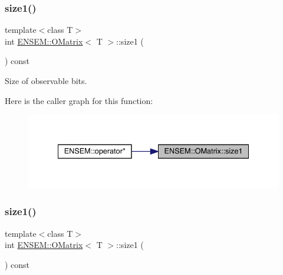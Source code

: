 \subsubsection{\texorpdfstring{size1()}{size1()}\hspace{0.1cm}{\footnotesize\ttfamily [1/3]}}
{\footnotesize\ttfamily template$<$class T$>$ \\
int \mbox{\hyperlink{classENSEM_1_1OMatrix}{E\+N\+S\+E\+M\+::\+O\+Matrix}}$<$ T $>$\+::size1 (\begin{DoxyParamCaption}{ }\end{DoxyParamCaption}) const\hspace{0.3cm}{\ttfamily [inline]}}



Size of observable bits. 

Here is the caller graph for this function\+:
\nopagebreak
\begin{figure}[H]
\begin{center}
\leavevmode
\includegraphics[width=335pt]{dd/d80/classENSEM_1_1OMatrix_a850b4d2a93be69f82df4a2d0165bc397_icgraph}
\end{center}
\end{figure}
\mbox{\label{classENSEM_1_1OMatrix_a850b4d2a93be69f82df4a2d0165bc397}} 
\subsubsection{\texorpdfstring{size1()}{size1()}\hspace{0.1cm}{\footnotesize\ttfamily [2/3]}}
{\footnotesize\ttfamily template$<$class T$>$ \\
int \mbox{\hyperlink{classENSEM_1_1OMatrix}{E\+N\+S\+E\+M\+::\+O\+Matrix}}$<$ T $>$\+::size1 (\begin{DoxyParamCaption}{ }\end{DoxyParamCaption}) const\hspace{0.3cm}{\ttfamily [inline]}}



